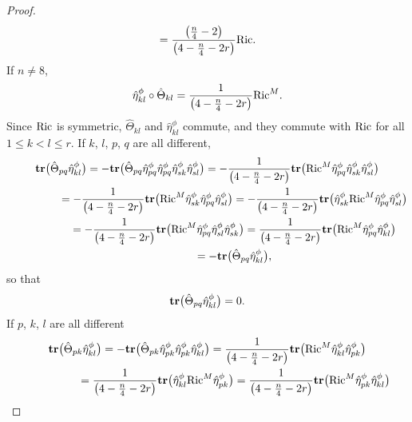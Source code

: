 \documentclass[pdftex]{sigma}
\newcommand{\tr}{\mbox{\bf tr}}
\numberwithin{equation}{section}
\begin{document}
\begin{proof}
\begin{gather*}
={\left({n\over 4}-2\right)\over \left(4-{n\over 4}-2r\right)} {\rm Ric}.
\end{gather*}
If $n\not = 8$,
\begin{gather}
\hat\eta_{kl}^\phi\circ\hat\Theta_{kl} = {1\over \left(4-{n\over 4}-2r\right)} {\rm Ric}^M. \label{eq: eta theta Ric}
\end{gather}
Since ${\rm Ric}$ is symmetric, $\hat\Theta_{kl}$ and $\hat\eta_{kl}^\phi$ commute, and they commute with ${\rm Ric}$ for all $1\leq k<l\leq r$. If $k$, $l$, $p$, $q$ are all different,
\begin{gather*}
\tr\big(\hat\Theta_{pq}\hat\eta_{kl}^\phi\big) =
-\tr\big(\hat\Theta_{pq}\hat\eta_{pq}^\phi\hat\eta_{pq}^\phi\hat\eta_{sk}^\phi\hat\eta_{sl}^\phi\big) =
-{1\over \left(4-{n\over 4}-2r\right)}\tr\big({\rm Ric}^M\hat\eta_{pq}^\phi\hat\eta_{sk}^\phi\hat\eta_{sl}^\phi\big) \\
\hphantom{\tr\big(\hat\Theta_{pq}\hat\eta_{kl}^\phi\big)}{} =
-{1\over \left(4-{n\over 4}-2r\right)}\tr\big({\rm Ric}^M\hat\eta_{sk}^\phi\hat\eta_{pq}^\phi\hat\eta_{sl}^\phi\big) =
-{1\over \left(4-{n\over 4}-2r\right)}\tr\big(\hat\eta_{sk}^\phi{\rm Ric}^M\hat\eta_{pq}^\phi\hat\eta_{sl}^\phi\big) \\
\hphantom{\tr\big(\hat\Theta_{pq}\hat\eta_{kl}^\phi\big)}{} =
-{1\over \left(4-{n\over 4}-2r\right)}\tr\big({\rm Ric}^M\hat\eta_{pq}^\phi\hat\eta_{sl}^\phi\hat\eta_{sk}^\phi\big) =
{1\over \left(4-{n\over 4}-2r\right)}\tr\big({\rm Ric}^M\hat\eta_{pq}^\phi\hat\eta_{kl}^\phi\big) \\
\hphantom{\tr\big(\hat\Theta_{pq}\hat\eta_{kl}^\phi\big)}{}
 = -\tr\big(\hat\Theta_{pq}\hat\eta_{kl}^\phi\big) ,
\end{gather*}
so that
\begin{gather}
\tr\big(\hat\Theta_{pq}\hat\eta_{kl}^\phi\big)=0.\label{eq: vanishing traces 3}
\end{gather}
If $p$, $k$, $l$ are all different
\begin{gather*}
\tr\big(\hat\Theta_{pk}\hat\eta_{kl}^\phi\big) = -\tr\big(\hat\Theta_{pk}\hat\eta_{pk}^\phi\hat\eta_{pk}^\phi\hat\eta_{kl}^\phi\big)
= {1\over \left(4-{n\over 4}-2r\right)}\tr\big({\rm Ric}^M\hat\eta_{kl}^\phi\hat\eta_{pk}^\phi\big) \\
\hphantom{\tr\big(\hat\Theta_{pk}\hat\eta_{kl}^\phi\big)}{}
 = {1\over \left(4-{n\over 4}-2r\right)}\tr\big(\hat\eta_{kl}^\phi{\rm Ric}^M\hat\eta_{pk}^\phi\big) =
 {1\over \left(4-{n\over 4}-2r\right)}\tr\big({\rm Ric}^M\hat\eta_{pk}^\phi\hat\eta_{kl}^\phi\big) \\

\end{gather*}
\end{proof}
\end{document}
